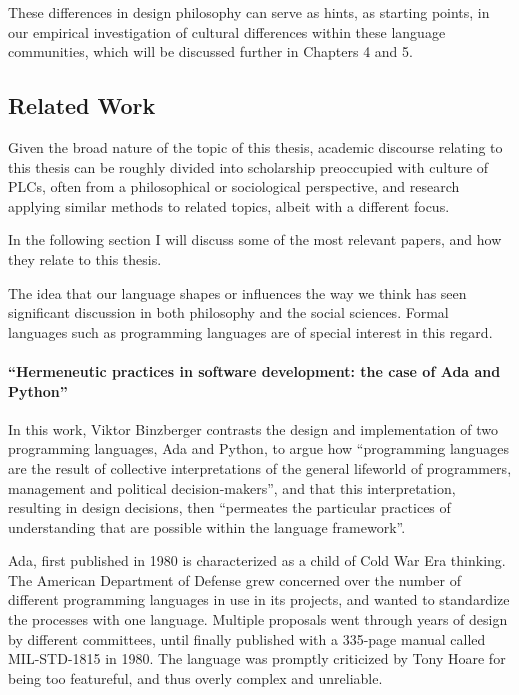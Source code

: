 These differences in design philosophy can serve as hints, as starting points, in our empirical investigation of
cultural differences within these language communities, which will be discussed further in Chapters 4 and 5.

\subsection{Related Work}

Given the broad nature of the topic of this thesis, academic discourse relating to this thesis can be roughly divided
into scholarship preoccupied with culture of PLCs, often from a philosophical or sociological perspective,
and research applying similar methods to related topics, albeit with a different focus. \cite{lenberg_behavioral_2015}

In the following section I will discuss some of the most relevant papers, and how they relate to this thesis.

The idea that our language shapes or influences the way we think has seen significant discussion in both philosophy
and the social sciences. \cite{li_language_2019}
Formal languages such as programming languages are of special interest in this regard.\cite{graham_hackers_2004, iverson_notation_2007}

\paragraph*{“Hermeneutic practices in software development: the case of Ada and Python” \cite{binzberger_hermeneutic_2009}}

In this work, Viktor Binzberger contrasts the design and implementation of two programming languages, Ada and Python,
to argue how “programming languages are the result of collective interpretations of the general lifeworld of programmers,
management and political decision-makers”, and that this interpretation, resulting in design decisions, then “permeates
the particular practices of understanding that are possible within the language framework”.\cite[ p.27]{binzberger_hermeneutic_2009}

Ada, first published in 1980 is characterized as a child of Cold War Era thinking. The American Department of Defense
grew concerned over the number of different programming languages in use in its projects, and wanted to standardize the
processes with one language. Multiple proposals went through years of design by different committees, until finally
published with a 335-page manual called MIL-STD-1815 in 1980. The language was promptly criticized by Tony Hoare for
being too featureful, and thus overly complex and unreliable.\cite[ p.11, par.5]{hoare_emperor_1981}

